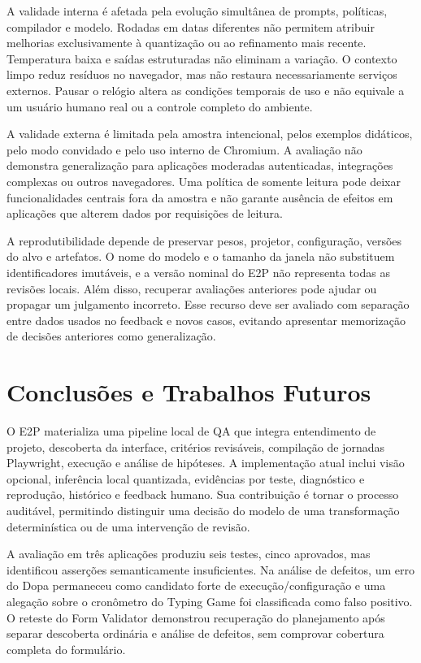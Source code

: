 \documentclass[12pt]{article}
\begin{document}
A validade interna é afetada pela evolução simultânea de prompts, políticas, compilador e modelo. Rodadas em datas diferentes não permitem atribuir melhorias exclusivamente à quantização ou ao refinamento mais recente. Temperatura baixa e saídas estruturadas não eliminam a variação. O contexto limpo reduz resíduos no navegador, mas não restaura necessariamente serviços externos. Pausar o relógio altera as condições temporais de uso e não equivale a um usuário humano real ou a controle completo do ambiente.

A validade externa é limitada pela amostra intencional, pelos exemplos didáticos, pelo modo convidado e pelo uso interno de Chromium. A avaliação não demonstra generalização para aplicações moderadas autenticadas, integrações complexas ou outros navegadores. Uma política de somente leitura pode deixar funcionalidades centrais fora da amostra e não garante ausência de efeitos em aplicações que alterem dados por requisições de leitura.

A reprodutibilidade depende de preservar pesos, projetor, configuração, versões do alvo e artefatos. O nome do modelo e o tamanho da janela não substituem identificadores imutáveis, e a versão nominal do E2P não representa todas as revisões locais. Além disso, recuperar avaliações anteriores pode ajudar ou propagar um julgamento incorreto. Esse recurso deve ser avaliado com separação entre dados usados no feedback e novos casos, evitando apresentar memorização de decisões anteriores como generalização.

\section{Conclusões e Trabalhos Futuros}\label{sec:conclusion}
O E2P materializa uma pipeline local de QA que integra entendimento de projeto, descoberta da interface, critérios revisáveis, compilação de jornadas Playwright, execução e análise de hipóteses. A implementação atual inclui visão opcional, inferência local quantizada, evidências por teste, diagnóstico e reprodução, histórico e feedback humano. Sua contribuição é tornar o processo auditável, permitindo distinguir uma decisão do modelo de uma transformação determinística ou de uma intervenção de revisão.

A avaliação em três aplicações produziu seis testes, cinco aprovados, mas identificou asserções semanticamente insuficientes. Na análise de defeitos, um erro do Dopa permaneceu como candidato forte de execução/configuração e uma alegação sobre o cronômetro do Typing Game foi classificada como falso positivo. O reteste do Form Validator demonstrou recuperação do planejamento após separar descoberta ordinária e análise de defeitos, sem comprovar cobertura completa do formulário.
\end{document}
